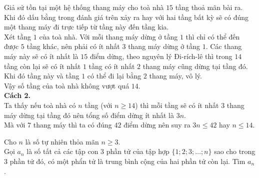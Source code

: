 \begin{ex}
{		Giả sử tồn tại một hệ thống thang máy cho toà nhà $15$ tầng thoả mãn bài ra. Khi đó dấu bằng trong đánh giá trên xảy ra hay với hai tầng bất kỳ sẽ có đúng một thang máy đi trực tiếp từ tầng này đến tầng kia.\\
		Xét tầng $1$ của toà nhà. Với mỗi thang máy dừng ở tầng $1$ thì chỉ có thể đến được $5$ tầng khác, nên phải có ít nhất $3$ thang máy dừng ở tầng $1$. Các thang máy này sẽ có ít nhất là $15$ điểm dừng, theo nguyên lý Đi-rích-lê thì trong $14$ tầng còn lại sẽ có ít nhất $1$ tầng có ít nhất $2$ thang máy cũng dừng tại tầng đó. Khi đó tầng này và tầng $1$ có thể đi lại bằng $2$ thang máy, vô lý.\\
		Vậy số tầng của toà nhà không vượt quá $14$.\\
		\textbf{Cách 2.}\\
		Ta thấy nếu toà nhà có $n$ tầng (với $n\ge 14$) thì mỗi tầng sẽ có ít nhất $3$ thang máy dừng tại tầng đó nên tổng số điểm dừng ít nhất là $3n$.\\
		Mà với $7$ thang máy thì ta có đúng $42$ điểm dừng nên suy ra $3n\le 42$ hay $n\le 14$.
	}
\end{ex}


\begin{ex}%
Cho $ n $ là số tự nhiên thỏa mãn $ n \geq 3 $.\\
Gọi $a_n$ là số tất cả các tập con 3 phần tử của tập hợp $ \{1;2;3;\ldots;n\}$ sao cho trong 3 phần tử đó, có một phẩn tử là trung bình cộng của hai phần tử còn lại. Tìm $a_n$.
\end{ex}

